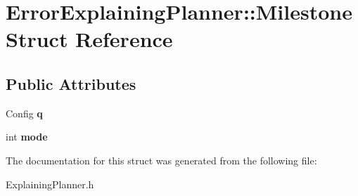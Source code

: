 \section{Error\+Explaining\+Planner\+:\+:Milestone Struct Reference}
\label{structErrorExplainingPlanner_1_1Milestone}
\subsection*{Public Attributes}
\begin{DoxyCompactItemize}
\item 
Config {\bfseries q}\label{structErrorExplainingPlanner_1_1Milestone_abf8488fe8871bebab3ea73ee391349e9}

\item 
int {\bfseries mode}\label{structErrorExplainingPlanner_1_1Milestone_ad98b2047a092ce396b70994db55552a7}

\end{DoxyCompactItemize}


The documentation for this struct was generated from the following file\+:\begin{DoxyCompactItemize}
\item 
Explaining\+Planner.\+h\end{DoxyCompactItemize}
